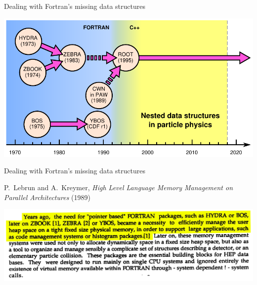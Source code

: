 \documentclass[aspectratio=169]{beamer}
\begin{document}
\begin{frame}{Dealing with Fortran's missing data structures}
\vspace{0.25 cm}
\begin{center}
\includegraphics[width=0.9\linewidth]{PLOTS/history-0.pdf}
\end{center}
\end{frame}

\begin{frame}{Dealing with Fortran's missing data structures}
\vspace{0.25 cm}
\begin{center}
\begin{minipage}{0.8\linewidth}
\begin{center}
P.\ Lebrun and A.\ Kreymer, {\it High Level Language Memory Management on Parallel Architectures} (1989)
\end{center}
\end{minipage}

\includegraphics[width=0.9\linewidth]{PLOTS/lebrun-kreymer-zebra.png}
\end{center}
\end{frame}
\end{document}
